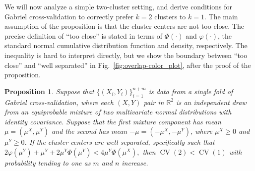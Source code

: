 \documentclass[12pt]{article}
\newtheorem{proposition}{Proposition}
\newcommand{\CV}{\operatorname{CV}}
\newcommand{\R}{\mathbb{R}}
\newcommand{\muX}{\mu^{X}}
\newcommand{\muY}{\mu^{Y}}
\begin{document}
We will now analyze a simple two-cluster setting, and derive conditions for
Gabriel cross-validation to correctly prefer $k=2$ clusters to $k=1$.  The
main assumption of the proposition is that the cluster centers are not too
close. The precise definition of ``too close'' is stated in terms of
$\Phi(\cdot)$ and $\varphi(\cdot)$, the standard normal cumulative
distribution function and density, respectively.  The inequality is hard to
interpret directly, but we show the boundary between ``too close'' and ``well
separated'' in Fig.~\ref{fig:overlap-color_plot}, after the proof of the
proposition.


\begin{proposition}\label{prop:twoclust}
Suppose that $\{(X_i,Y_i)\}_{i=1}^{n+m}$ is data from a single fold of Gabriel
cross-validation, where each $(X,Y)$ pair in $\R^2$ is an independent draw
from an equiprobable mixture of two multivariate normal distributions with
identity covariance. Suppose that the first mixture component has mean
$\mu = (\muX, \muY)$ and the second has mean $-\mu = (-\muX, -\muY)$,
where $\muX \geq 0$ and $\muY \geq 0$. 
If the cluster centers are well separated, specifically such that
\(
  2 \varphi(\muY) + \muY + 2 \muY \Phi(\muY) < 4 \muY \Phi(\muX),
\)
then $\CV(2) < \CV(1)$ with probability tending to one as $m$ and $n$ increase.
\end{proposition}
\end{document}
